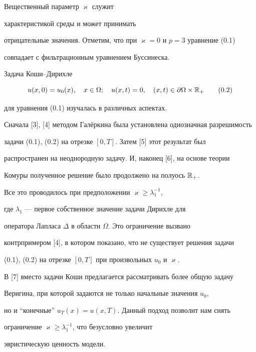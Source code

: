 Вещественный параметр $\varkappa$ служит


характеристикой среды и может принимать


отрицательные значения. Отметим, что при $\varkappa=0$ и $p=3$ уравнение (0.1)


совпадает с фильтрационным уравнением Буссинеска.





Задача Коши--Дирихле


\begin{equation}


u(x,0) = u_0(x),\quad x\in\Omega;\quad


u(x,t) = 0,\quad (x,t)\in\partial\Omega\times{\Bbb R}_+\tag{0.2}


\end{equation}


для уравнения (0.1) изучалась в различных аспектах.


Сначала [3], [4] методом Гал\"еркина была установлена однозначная разрешимость


задачи (0.1), (0.2) на отрезке $[0,T]$. Затем [5] этот результат был


распространен на неоднородную задачу. И, наконец [6], на основе теории


Комуры полученное решение было продолжено на полуось ${\Bbb R}_+$.


Все это проводилось при предположении $\varkappa\ge\lambda^{-1}_1$,


где $\lambda_1$ --- первое собственное значение задачи Дирихле для


оператора Лапласа $\Delta$ в области $\Omega$. Это ограничение вызвано


контрпримером [4], в котором показано, что не существует решения задачи


(0.1), (0.2) на отрезке $[0, T]$ при произвольных $u_0$ и $\varkappa$.





В [7] вместо задачи Коши предлагается рассматривать более общую задачу


Веригина, при которой задаются не только начальные значения $u_0$,


но и ``конечные'' $u_T(x) = u(x,T)$. Данный подход позволит нам снять


ограничение $\varkappa\ge\lambda^{-1}_1$, что безусловно увеличит


эвристическую ценность модели.








